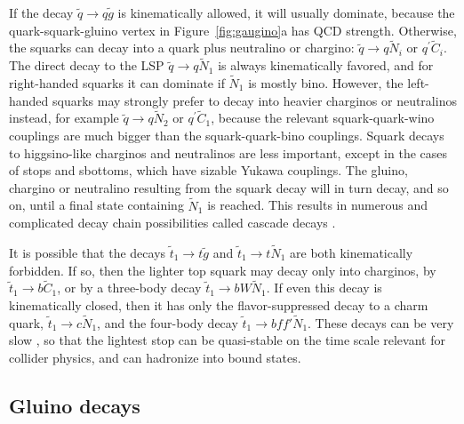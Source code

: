 \documentclass[11pt]{article}
\def\stilde{\widetilde}
\begin{document}
If the decay $ \stilde q \rightarrow q\stilde g $ is kinematically 
allowed, it will usually dominate, because the quark-squark-gluino vertex 
in Figure~{\ref{fig:gaugino}}a has QCD strength. Otherwise, the squarks 
can decay into a quark plus neutralino or chargino: $ \stilde q 
\rightarrow q \stilde N_i$ or $ q^\prime \stilde C_i $. The direct decay 
to the LSP $\stilde q \rightarrow q \stilde N_1$ is always kinematically 
favored, and for right-handed squarks it can dominate if 
$\stilde N_1$ is mostly bino. However, the left-handed squarks may strongly prefer 
to decay into heavier charginos or neutralinos instead, for example 
$\stilde q \rightarrow q \stilde N_2$ or $q^\prime \stilde C_1$, because 
the relevant squark-quark-wino couplings are much bigger than the 
squark-quark-bino couplings. Squark decays to higgsino-like charginos and 
neutralinos are less important, except in the cases of stops and sbottoms, 
which have sizable Yukawa couplings. The gluino, chargino or neutralino 
resulting from the squark decay will in turn decay, and so on, until a 
final state containing $\stilde N_1$ is reached. This results in 
numerous and complicated decay chain possibilities called cascade decays 
\cite{cascades}.

It is possible that the decays $\stilde t_1 \rightarrow t\stilde g$ and 
$\stilde t_1 \rightarrow t \stilde N_1$ are both kinematically forbidden. 
If so, then the lighter top squark may decay only into charginos, by 
$\stilde t_1 \rightarrow b \stilde C_1$, or by a three-body decay
$\stilde t_1 \rightarrow b W \stilde N_1$. If even this decay is 
kinematically closed, then it has only the flavor-suppressed decay to a 
charm quark, $ \stilde t_1\rightarrow c \stilde N_1$, and the four-body 
decay $ \stilde t_1\rightarrow bff' \stilde N_1 $. These decays can be 
very slow \cite{stoptocharmdecay}, so that the lightest stop can be 
quasi-stable on the time scale relevant for collider physics, and can 
hadronize into bound states.

\subsection{Gluino decays}\label{subsec:decays.gluino}
\setcounter{equation}{0}
\setcounter{footnote}{1}
\end{document}
